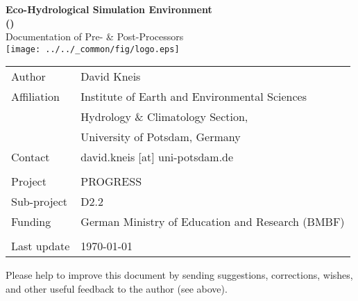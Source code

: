 \documentclass[a4paper,twocolumn,10pt,fleqn]{book}
\begin{document}

\pagestyle{empty}
\onecolumn

\begin{center}
  \vspace*{5cm}
  \LARGE
  \textbf{Eco-Hydrological Simulation Environment \\ ()} \\
  \vspace*{1.2cm}
  Documentation of Pre- \& Post-Processors \\
  \vspace*{2.0cm}
  \texttt{[image: ../../\_common/fig/logo.eps]}
\end{center}

\cleardoublepage

\vspace*{12cm}
\begin{tabular}{ll}
Author      & David Kneis \\
Affiliation & Institute of Earth and Environmental Sciences \\
            & Hydrology \& Climatology Section, \\
            & University of Potsdam, Germany \\
Contact     & david.kneis [at] uni-potsdam.de \\
            & \\
Project     & PROGRESS \\
Sub-project & D2.2 \\
Funding     & German Ministry of Education and Research (BMBF) \\
            & \\
Last update & \today{} \\
\end{tabular}

\vspace*{2.0cm}
\noindent Please help to improve this document by sending suggestions, corrections, wishes, and other useful feedback to the author (see above).

\cleardoublepage

\end{document}
